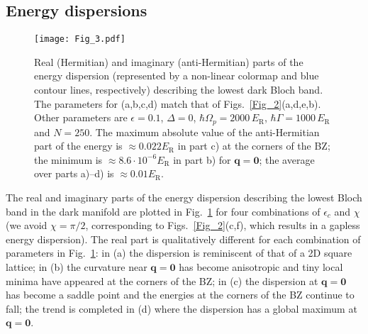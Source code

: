 \documentclass[aps,pra,twocolumn,showpacs,superscriptaddress,floatfix,longbibliography]{revtex4-1}
\def\Er{E_{\mathrm R}}                            			%
\begin{document}
\subsection{Energy dispersions} \label{sec_energy_dispersions}

\begin{figure}[t]
\centering
  \texttt{[image: Fig\_3.pdf]}
  \caption{Real (Hermitian) and imaginary (anti-Hermitian) parts of the energy dispersion (represented by a non-linear colormap and blue contour lines, respectively) describing the lowest dark Bloch band. The parameters for (a,b,c,d) match that of Figs.~\ref{Fig_2}(a,d,e,b).
  Other parameters
  are $\epsilon=0.1$, $\Delta=0$, $\hbar \Omega_p = 2000 \, \Er$, $\hbar \Gamma = 1000 \, \Er$ and $N=250$.
  The maximum absolute value of the anti-Hermitian part of the energy is $ \approx 0.022 \Er$ in part c) at the corners of the BZ; the minimum is $\approx 8.6 \cdot 10^{-6} \Er$ in part b) for $\boldsymbol{q}=\mathbf{0}$; the average over parts a)--d) is $\approx 0.01 \Er$.}
  \label{Fig_3}
\end{figure}

The real and imaginary parts of the energy dispersion describing the lowest Bloch band in the dark manifold are plotted in Fig.~\ref{Fig_3} for four combinations of $\epsilon_c$ and $\chi$ (we avoid $\chi=\pi/2$, corresponding to Figs.~\ref{Fig_2}(c,f), which results in a gapless energy dispersion).
The real part is qualitatively different for each combination of parameters in Fig.~\ref{Fig_3}: in (a) the dispersion is reminiscent of that of a 2D square lattice; in (b) the curvature near ${\boldsymbol{q}=\mathbf{0}}$ has become anisotropic and tiny local minima have appeared at the corners of the BZ; in (c) the dispersion at ${\boldsymbol{q}=\mathbf{0}}$ has become a saddle point and the energies at the corners of the BZ continue to fall; the trend is completed in (d) where the dispersion has a global maximum at ${\boldsymbol{q}=\mathbf{0}}$.
\end{document}
